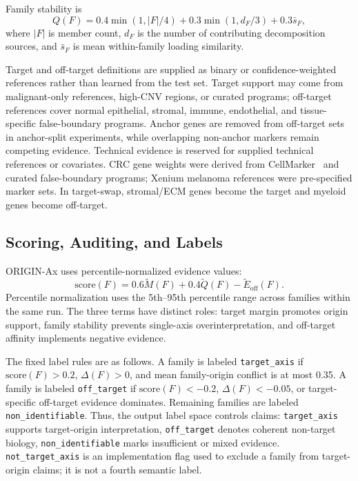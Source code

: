 \documentclass[conference]{IEEEtran}
\begin{document}
Family stability is
\begin{equation}
Q(F)=0.4\min(1,|F|/4)+0.3\min(1,d_F/3)+0.3\bar{s}_F,
\end{equation}
where $|F|$ is member count, $d_F$ is the number of contributing decomposition
sources, and $\bar{s}_F$ is mean within-family loading similarity.

Target and off-target definitions are supplied as binary or confidence-weighted
references rather than learned from the test set. Target support may come from
malignant-only references, high-CNV regions, or curated programs; off-target
references cover normal epithelial, stromal, immune, endothelial, and
tissue-specific false-boundary programs. Anchor genes are removed from
off-target sets in anchor-split experiments, while overlapping non-anchor
markers remain competing evidence. Technical evidence is reserved for supplied
technical references or covariates. CRC gene weights were derived from
CellMarker~\cite{zhang2019cellmarker} and curated false-boundary programs;
Xenium melanoma references were pre-specified marker sets. In target-swap,
stromal/ECM genes become the target and myeloid genes become off-target.

\subsection{Scoring, Auditing, and Labels}

ORIGIN-Ax uses percentile-normalized evidence values:
\begin{equation}
\mathrm{score}(F)=0.6\widetilde{M}(F)+0.4\widetilde{Q}(F)
-\widetilde{E}_{\mathrm{off}}(F).
\end{equation}
Percentile normalization uses the 5th--95th percentile range across families
within the same run. The three terms have distinct roles: target margin
promotes origin support, family stability prevents single-axis
overinterpretation, and off-target affinity implements negative evidence.

The fixed label rules are as follows. A family is labeled \texttt{target\_axis}
if $\mathrm{score}(F)>0.2$, $\Delta(F)>0$, and mean family-origin conflict is
at most 0.35. A family is labeled \texttt{off\_target} if
$\mathrm{score}(F)<-0.2$, $\Delta(F)<-0.05$, or target-specific off-target
evidence dominates. Remaining families are labeled
\texttt{non\_identifiable}. Thus, the output label space controls claims:
\texttt{target\_axis} supports target-origin interpretation,
\texttt{off\_target} denotes coherent non-target biology,
\texttt{non\_identifiable} marks insufficient or mixed evidence.
\texttt{not\_target\_axis} is an implementation flag used to exclude a family
from target-origin claims; it is not a fourth semantic label.
\end{document}
